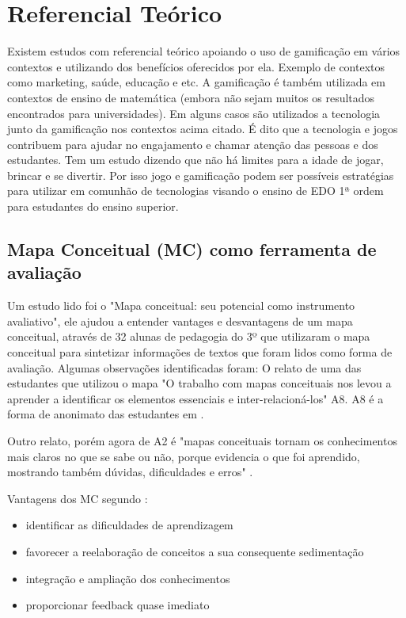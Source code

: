 \chapter[Referencial Teórico]{Referencial Teórico}
Existem estudos com referencial teórico apoiando o uso de gamificação em vários contextos e utilizando dos benefícios oferecidos por ela. Exemplo de contextos como marketing, saúde, educação e etc. A gamificação é também utilizada em contextos de ensino de matemática (embora não sejam muitos os resultados encontrados para universidades). Em alguns casos são utilizados a tecnologia junto da gamificação nos contextos acima citado. É dito que a tecnologia e jogos contribuem para ajudar no engajamento e chamar atenção das pessoas e dos estudantes.
Tem um estudo dizendo que não há limites para a idade de jogar, brincar e se divertir. Por isso jogo e gamificação podem ser possíveis estratégias para utilizar em comunhão de tecnologias visando o ensino de EDO 1ª ordem para estudantes do ensino superior.

\section[Mapa Conceitual (MC)  como ferramenta de avaliação]{Mapa Conceitual (MC) como ferramenta de avaliação}

Um estudo lido foi o "Mapa conceitual: seu potencial como instrumento avaliativo", ele ajudou a entender vantages e desvantagens de um mapa conceitual, através de 32 alunas de pedagogia do 3º que utilizaram o mapa conceitual para sintetizar informações de textos que foram lidos como forma de avaliação. Algumas observações identificadas foram: 
O relato de uma das estudantes que utilizou o mapa "O trabalho com mapas conceituais nos levou a aprender a identificar os elementos essenciais e inter-relacioná-los" A8. A8 é a forma de anonimato das estudantes em \cite{vantagensDesvantagensMC}.

Outro relato, porém agora de A2 é "mapas conceituais tornam os conhecimentos mais claros no que se sabe ou não, porque evidencia o que foi aprendido, mostrando também dúvidas, dificuldades e erros" \cite{vantagensDesvantagensMC}.

Vantagens dos MC segundo \cite{vantagensDesvantagensMC}: 
\begin{itemize}
\item[]identificar as dificuldades de aprendizagem
\item[]favorecer a reelaboração de conceitos a sua consequente sedimentação
\item[]integração e ampliação dos conhecimentos
\item[]proporcionar feedback quase imediato
\end{itemize}

